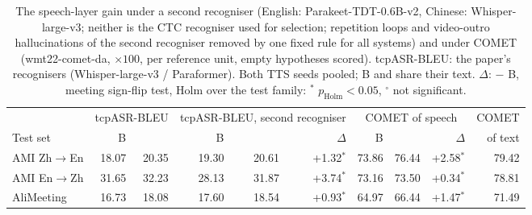 \begin{table}[t]
\centering\small
\setlength{\tabcolsep}{4pt}
\begin{tabular}{lrrrrrrrrr}
\toprule
 & \multicolumn{2}{c}{tcpASR-BLEU} & \multicolumn{3}{c}{tcpASR-BLEU, second recogniser} & \multicolumn{3}{c}{COMET of speech} & COMET \\
\cmidrule(lr){2-3}\cmidrule(lr){4-6}\cmidrule(lr){7-9}
Test set & B & \sys{} & B & \sys{} & $\Delta$ & B & \sys{} & $\Delta$ & of text \\
\midrule
AMI Zh$\rightarrow$En & 18.07 & 20.35 & 19.30 & 20.61 & +1.32$^{*}$ & 73.86 & 76.44 & +2.58$^{*}$ & 79.42 \\
AMI En$\rightarrow$Zh & 31.65 & 32.23 & 28.13 & 31.87 & +3.74$^{*}$ & 73.16 & 73.50 & +0.34$^{*}$ & 78.81 \\
AliMeeting & 16.73 & 18.08 & 17.60 & 18.54 & +0.93$^{*}$ & 64.97 & 66.44 & +1.47$^{*}$ & 71.49 \\
\bottomrule
\end{tabular}
\caption{The speech-layer gain under a second recogniser (English: Parakeet-TDT-0.6B-v2, Chinese: Whisper-large-v3; neither is the CTC recogniser used for selection; repetition loops and video-outro hallucinations of the second recogniser removed by one fixed rule for all systems) and under COMET (wmt22-comet-da, $\times100$, per reference unit, empty hypotheses scored). tcpASR-BLEU: the paper's recognisers (Whisper-large-v3 / Paraformer). Both TTS seeds pooled; B and \sys{} share their text. $\Delta$: \sys{} $-$ B, meeting sign-flip test, Holm over the test family: $^{*}$ $p_\text{Holm}<0.05$, $^{\circ}$ not significant.}
\label{tab:metricsv11}
\end{table}
